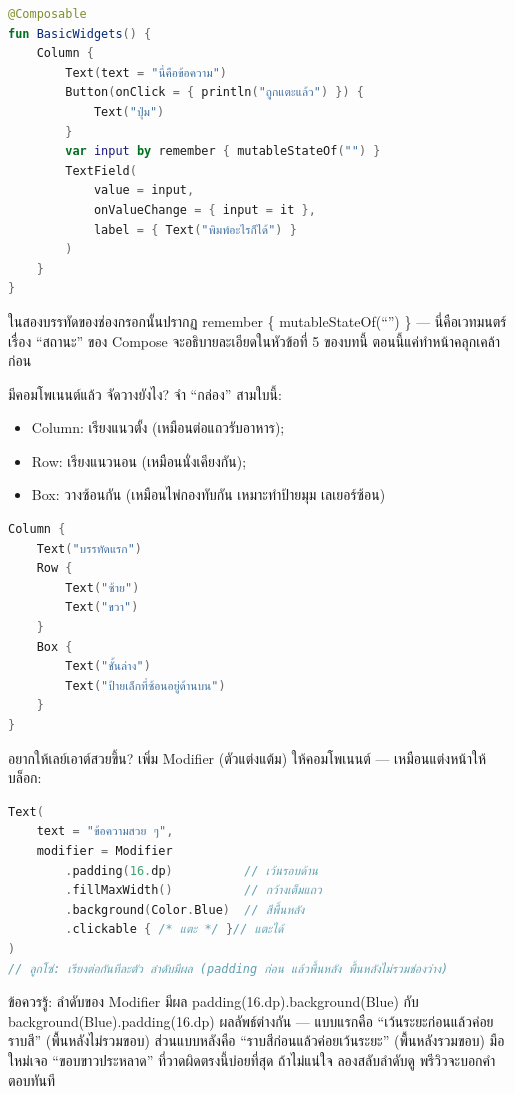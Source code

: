 \begin{lstlisting}[language=Kotlin]
@Composable
fun BasicWidgets() {
    Column {
        Text(text = "นี่คือข้อความ")
        Button(onClick = { println("ถูกแตะแล้ว") }) {
            Text("ปุ่ม")
        }
        var input by remember { mutableStateOf("") }
        TextField(
            value = input,
            onValueChange = { input = it },
            label = { Text("พิมพ์อะไรก็ได้") }
        )
    }
}
\end{lstlisting}

ในสองบรรทัดของช่องกรอกนั้นปรากฏ remember \{ mutableStateOf(“”) \} — นี่คือเวทมนตร์เรื่อง “สถานะ” ของ Compose จะอธิบายละเอียดในหัวข้อที่ 5 ของบทนี้ ตอนนี้แค่ทำหน้าคลุกเคล้าก่อน


มีคอมโพเนนต์แล้ว จัดวางยังไง? จำ “กล่อง” สามใบนี้:

\begin{itemize}
  \item Column: เรียงแนวตั้ง (เหมือนต่อแถวรับอาหาร);
  \item Row: เรียงแนวนอน (เหมือนนั่งเคียงกัน);
  \item Box: วางซ้อนกัน (เหมือนไพ่กองทับกัน เหมาะทำป้ายมุม เลเยอร์ซ้อน)
\end{itemize}

\begin{lstlisting}[language=Kotlin]
Column {
    Text("บรรทัดแรก")
    Row {
        Text("ซ้าย")
        Text("ขวา")
    }
    Box {
        Text("ชั้นล่าง")
        Text("ป้ายเล็กที่ซ้อนอยู่ด้านบน")
    }
}
\end{lstlisting}

อยากให้เลย์เอาต์สวยขึ้น? เพิ่ม Modifier (ตัวแต่งแต้ม) ให้คอมโพเนนต์ — เหมือนแต่งหน้าให้บล็อก:

\begin{lstlisting}[language=Kotlin]
Text(
    text = "ข้อความสวย ๆ",
    modifier = Modifier
        .padding(16.dp)          // เว้นรอบด้าน
        .fillMaxWidth()          // กว้างเต็มแถว
        .background(Color.Blue)  // สีพื้นหลัง
        .clickable { /* แตะ */ }// แตะได้
)
// ลูกโซ่: เรียงต่อกันทีละตัว ลำดับมีผล (padding ก่อน แล้วพื้นหลัง พื้นหลังไม่รวมช่องว่าง)
\end{lstlisting}

\begin{tcbwarn}{ข้อควรรู้: ลำดับของ Modifier มีผล}
padding(16.dp).background(Blue) กับ background(Blue).padding(16.dp) ผลลัพธ์ต่างกัน — แบบแรกคือ “เว้นระยะก่อนแล้วค่อยราบสี” (พื้นหลังไม่รวมขอบ) ส่วนแบบหลังคือ “ราบสีก่อนแล้วค่อยเว้นระยะ” (พื้นหลังรวมขอบ) มือใหม่เจอ “ขอบขาวประหลาด” ที่วาดผิดตรงนี้บ่อยที่สุด ถ้าไม่แน่ใจ ลองสลับลำดับดู พรีวิวจะบอกคำตอบทันที

\end{tcbwarn}

